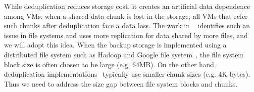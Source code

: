 
While deduplication reduces storage cost, it creates an artificial data dependence among VMs: when a shared data chunk
is lost in the storage, all VMs that refer such chunks after deduplication face a data loss.
The work in ~\cite{Reliability06} identifies such an issue in file systems 
and uses more replication for data shared by more files,
and we will adopt this idea.
When the backup storage is implemented using a distributed file system such as Hadoop and 
Google file system~\cite{googlefs03},  
the file system block  size is often chosen to be large (e.g. 64MB). On the other hand, 
deduplication implementations~\cite{Guo2011,extreme_binning09,bottleneck08,Jin2009,Dong2011}
 typically use smaller chunk sizes (e.g. 4K bytes).
Thus we need to address  the size gap between file system blocks and chunks.  

